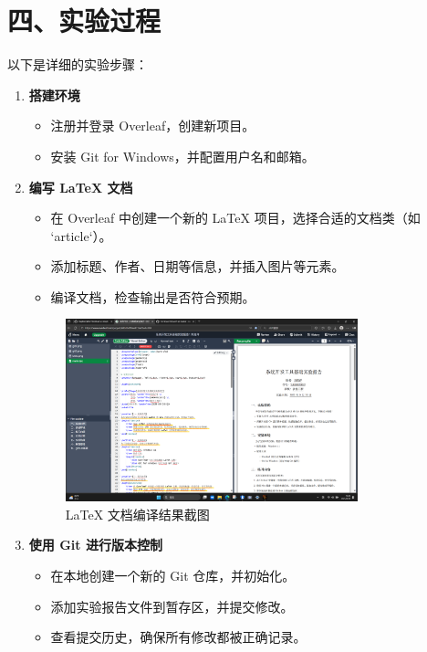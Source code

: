 \documentclass[a4paper, 12pt]{article}
\begin{document}
\section*{四、实验过程}
以下是详细的实验步骤：

\begin{enumerate}
    \item \textbf{搭建环境}
    \begin{itemize}
        \item 注册并登录 Overleaf，创建新项目。
        \item 安装 Git for Windows，并配置用户名和邮箱。
    \end{itemize}

    \item \textbf{编写 LaTeX 文档}
    \begin{itemize}
        \item 在 Overleaf 中创建一个新的 LaTeX 项目，选择合适的文档类（如 `article`）。
        \item 添加标题、作者、日期等信息，并插入图片等元素。
        \item 编译文档，检查输出是否符合预期。
    \end{itemize}

    \begin{figure}[htbp]
        \centering
        \includegraphics[width=0.8\textwidth]{latex.png}%
        \caption{LaTeX 文档编译结果截图}
        \label{fig:latex}
    \end{figure}

    \item \textbf{使用 Git 进行版本控制}
    \begin{itemize}
        \item 在本地创建一个新的 Git 仓库，并初始化。
        \item 添加实验报告文件到暂存区，并提交修改。
        \item 查看提交历史，确保所有修改都被正确记录。
    \end{itemize}
    

\end{enumerate}
\end{document}
